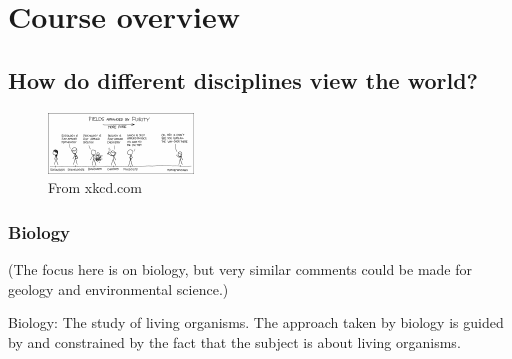 \section{Course overview}

\subsection{How do different disciplines view the world?}

\begin{figure}[h]
  \includegraphics[width=\textwidth]{./figs/purity.pdf}
  \caption{From xkcd.com}
\end{figure}


\subsubsection{Biology}

(The focus here is on biology, but very similar comments could be made for geology and environmental science.)

Biology: The study of living organisms. The approach taken by biology is guided by and constrained by the fact that the subject is about living organisms.

